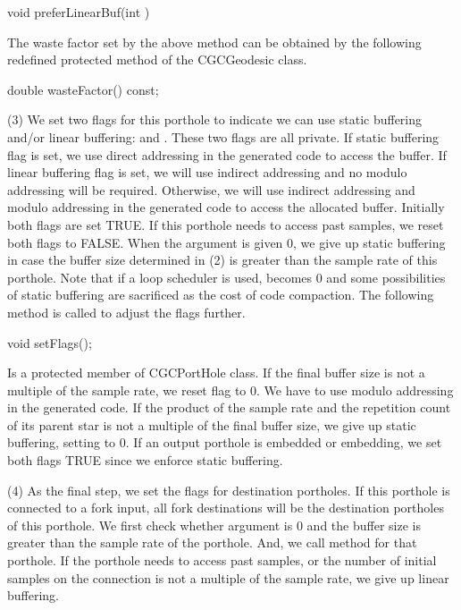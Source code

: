 \begin{example}
void preferLinearBuf(int )
\end{example}

The waste factor set by the above method can be obtained by the following
redefined protected method of the CGCGeodesic class.

\begin{example}
double wasteFactor() const;
\end{example}

(3) We set two flags for this porthole to indicate we can use static buffering
and/or linear buffering:  and . These two
flags are all private. If static buffering flag is set, we use direct
addressing in the generated code to access the buffer. If linear
buffering flag is set, we will use indirect addressing and no modulo addressing
will be required. Otherwise, we will use indirect addressing and modulo
addressing in the generated code to access the allocated buffer.
Initially both flags are set TRUE. If this porthole needs to access past
samples, we reset both flags to FALSE. When the argument  is
given 0, we give up static buffering in case the buffer size determined
in (2) is greater than the sample rate of this porthole. Note that
if a loop scheduler is used,  becomes 0 and some
possibilities of static buffering are sacrificed as the cost of
code compaction. The following method is called to adjust the flags further.

\begin{example}
void setFlags();
\end{example}

Is a protected member of CGCPortHole class. If the final buffer size is
not a multiple of the sample rate, we reset  flag to 0.
We have to use modulo addressing in the generated code. If the
product of the sample rate and the repetition count of its parent star is
not a multiple of the final buffer size, we give up static buffering, setting
 to 0. If an output porthole is embedded or embedding,
we set both flags TRUE since we enforce static buffering.

(4) As the final step, we set the flags for destination portholes. If this
porthole is connected to a fork input, all fork destinations will be
the destination portholes of this porthole. We first check whether
 argument is 0 and the buffer size is greater than the sample
rate of the porthole. And, we call  method for that porthole.
If the porthole needs to access past samples, or the number of initial
samples on the connection is not a multiple of the sample rate, we give up
linear buffering.

